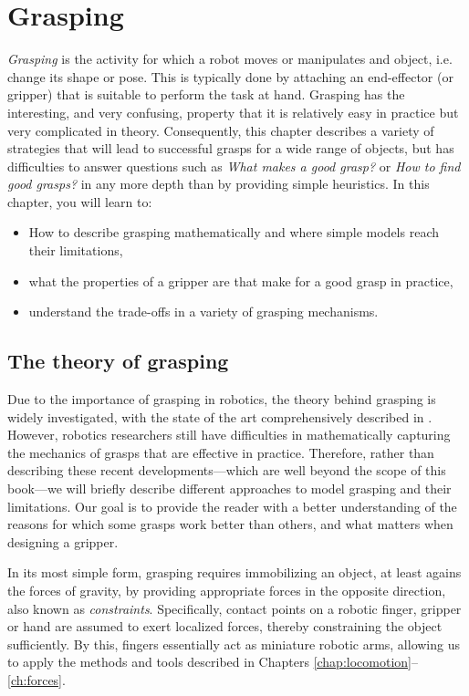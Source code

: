 \chapter{Grasping}\label{chap:grasping}

\textsl{Grasping} is the activity for which a robot moves or manipulates and object, i.e. change its shape or pose. This is typically done by attaching an end-effector (or gripper) that is suitable to perform the task at hand.
Grasping has the interesting, and very confusing, property that it is relatively easy in practice but very complicated in theory. Consequently, this chapter describes a variety of strategies that will lead to successful grasps for a wide range of objects, but has difficulties to answer questions such as \textsl{What makes a good grasp?} or \textsl{How to find good grasps?} in any more depth than by providing simple heuristics.
In this chapter, you will learn to:
\begin{itemize}
\item How to describe grasping mathematically and where simple models reach their limitations,
\item what the properties of a gripper are that make for a good grasp in practice,
\item understand the trade-offs in a variety of grasping mechanisms.
\end{itemize}

\section{The theory of grasping}

Due to the importance of grasping in robotics, the theory behind grasping is widely investigated, with the state of the art comprehensively described in \cite{rimon2019mechanics}. However, robotics researchers still have difficulties in mathematically capturing the mechanics of grasps that are effective in practice. Therefore, rather than describing these recent developments---which are well beyond the scope of this book---we will briefly describe different approaches to model grasping and their limitations. Our goal is to provide the reader with a better understanding of the reasons for which some grasps work better than others, and what matters when designing a gripper.

In its most simple form, grasping requires immobilizing an object, at least agains the forces of gravity, by providing appropriate forces in the opposite direction, also known as \textsl{constraints}. Specifically, contact points on a robotic finger, gripper or hand are assumed to exert localized forces, thereby constraining the object sufficiently. By this, fingers essentially act as miniature robotic arms, allowing us to apply the methods and tools described in Chapters \ref{chap:locomotion}--\ref{ch:forces}.

